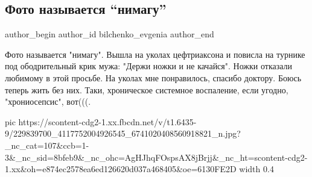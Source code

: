  
 
 
 
 
 
\subsection{Фото называется \enquote{нимагу}}
\label{sec:03_08_2021.fb.bilchenko_evgenia.2.foto_nimagu_turnik}
 
\ifcmt
 author_begin
   author_id bilchenko_evgenia
 author_end
\fi

Фото называется "нимагу". Вышла на уколах цефтриаксона и повисла на турнике под
ободрительный крик мужа: "Держи ножки и не качайся". Ножки отказали любимому в
этой просьбе. На уколах мне понравилось, спасибо доктору. Боюсь теперь жить без
них. Таки, хроническое системное воспаление, если угодно, "хрониосепсис",
вот(((.

\ifcmt
  pic https://scontent-cdg2-1.xx.fbcdn.net/v/t1.6435-9/229839700_4117752004926545_6741020408560918821_n.jpg?_nc_cat=107&ccb=1-3&_nc_sid=8bfeb9&_nc_ohc=AgHJhqFOspsAX8jBrjj&_nc_ht=scontent-cdg2-1.xx&oh=e874ec2578ea6ed126620d037a468405&oe=6130FE2D
  width 0.4
\fi

